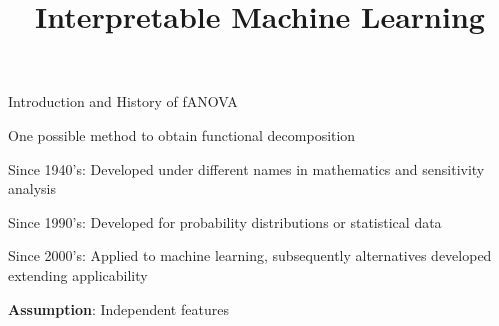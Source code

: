 \documentclass[10pt,compress,t,notes=noshow, xcolor=table]{beamer}
\title{Interpretable Machine Learning}
\begin{document}


\begin{framei}[align=top]{Introduction and History of fANOVA}
\item One possible method to obtain functional decomposition
\item Since 1940's: Developed under different names in mathematics and sensitivity analysis
\item Since 1990's: Developed for probability distributions or statistical data
\item Since 2000's: Applied to machine learning, subsequently alternatives developed extending applicability
\item \textbf{Assumption}: Independent features
\end{framei}
\end{document}
